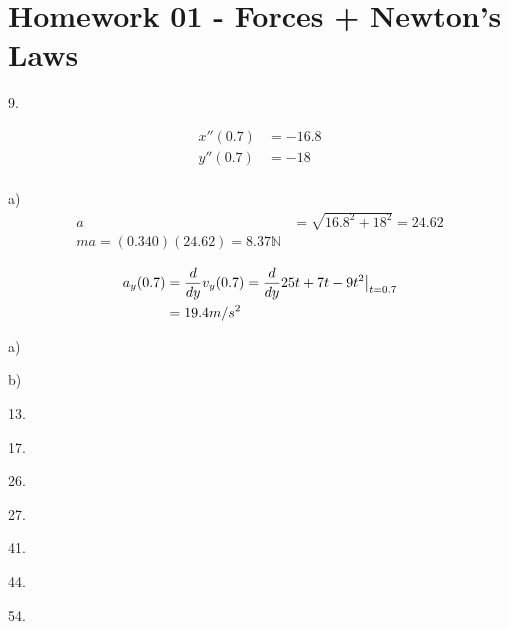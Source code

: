 \documentclass{scrreprt} %
\begin{document}
\section{Homework 01 - Forces + Newton's Laws}

9.

\begin{align*}
	x''(0.7) &= -16.8 \\
	y''(0.7) &= -18 \\
\end{align*}

a) \begin{align*}
a &= \sqrt{16.8^2 + 18^2} = 24.62 \\
ma = (0.340)(24.62) = \boxed{8.37 \mathbb{N}}
\end{align*}

\begin{align*}
	a_y(0.7) &= \frac{d}{dy}v_y(0.7) = \evalat{\frac{d}{dy}25t + 7t - 9t^2}{t=0.7} \\
			 &= 19.4 m/s^2
\end{align*}

a) 

b) 


13.

17.

26.

27.

41.

44.

54.
\end{document}

